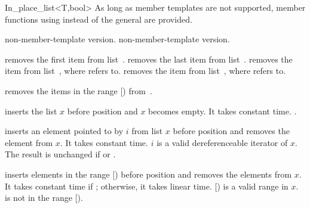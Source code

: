 \begin{ccClassTemplate}{In_place_list<T,bool>}
As long as member templates are not supported, member functions using
 instead of the general  are provided.

\ccHidden{}
 {non-member-template version.}
\ccHidden{}
 {non-member-template version.}



 {removes the first item from list~\ccVar.}
\ccGlue
{}
 {removes the last item from list~\ccVar.}
\ccGlue
{}
 {removes the item from list~\ccVar, where  refers to.}
\ccGlue
 {removes the item from list~\ccVar, where  refers to.}

\ccGlue
{}
 {removes the items in the range [) from~\ccVar.}




\ccGlue
{}
    {inserts the list $x$ before position  and $x$
      becomes empty. It takes constant time. 
     \ccPrecond \ccc{&} \ccVar {}.}

\ccGlue
{}
    {inserts an element pointed to by $i$ from list $x$ before
      position  and removes the element from $x$. It
      takes constant time. $i$ is a valid dereferenceable iterator of
      $x$. The result is unchanged if  or
      .}

\ccGlue
{}
    {inserts elements in the range [) before
      position  and removes the elements from $x$. It
      takes constant time if \ccVar; otherwise, it
      takes linear time. [) is a valid range in
      $x$.
    \ccPrecond {} is not in the range [).}


\end{ccClassTemplate}
